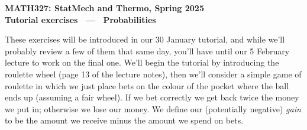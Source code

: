 \documentclass[12 pt]{article} %
\begin{document}
\newcommand{\thisunit}{MATH327 Tutorial (Probabilities)}
\newcommand{\moddate}{Last modified 29 Jan.~2025}
\begin{center}
  {\Large \textbf{MATH327: StatMech and Thermo, Spring 2025}} \\[12 pt]
  {\Large \textbf{Tutorial exercises \ --- \ Probabilities}} \\[24 pt]
\end{center}

These exercises will be introduced in our 30 January tutorial, and while we'll probably review a few of them that same day, you'll have until our 5 February lecture to work on the final one.
We'll begin the tutorial by introducing the roulette wheel (page 13 of the lecture notes), then we'll consider a simple game of roulette in which we just place bets on the colour of the pocket where the ball ends up (assuming a fair wheel).
If we bet correctly we get back twice the money we put in; otherwise we lose our money.
We define our (potentially negative) \textit{gain} to be the amount we receive minus the amount we spend on bets. \\[-20 pt]
\end{document}
